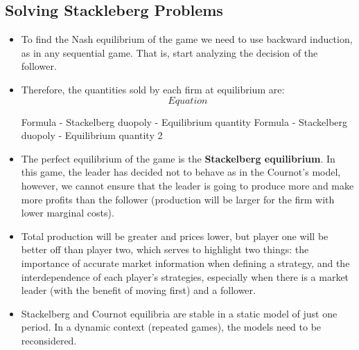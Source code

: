 \documentclass[]{report}
\begin{document}
\subsection*{Solving Stackleberg Problems}
\begin{itemize}

\item To find the Nash equilibrium of the game we need to use backward induction, as in any sequential game. That is, start analyzing the decision of the follower.

\item 

Therefore, the quantities sold by each firm at equilibrium are:
\[ Equation \]

Formula - Stackelberg duopoly - Equilibrium quantity	Formula - Stackelberg duopoly - Equilibrium quantity 2


\item The perfect equilibrium of the game is the \textbf{Stackelberg equilibrium}. In this game, the leader has decided not to behave as in the Cournot’s model, however, we cannot ensure that the leader is going to produce more and make more profits than the follower (production will be larger for the firm with lower marginal costs). 
\item Total production will be greater and prices lower, but player one will be better off than player two, which serves to highlight two things: the importance of accurate market information when defining a strategy, and the interdependence of each player’s strategies, especially when there is a market leader (with the benefit of moving first) and a follower.
\item 
Stackelberg and Cournot equilibria are stable in a static model of just one period. In a dynamic context (repeated games), the models need to be reconsidered.
\end{itemize}
\end{document}
